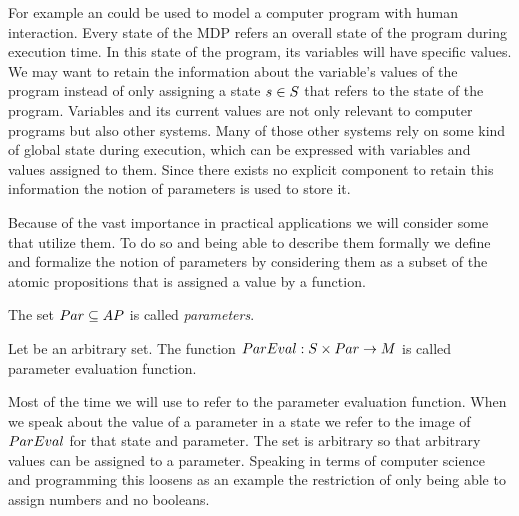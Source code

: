 \documentclass[preview]{standalone}
\begin{document}
For example an \mdpN could be used to model a computer program with human interaction. Every state of the MDP refers an overall state of the program during execution time. In this state of the program, its variables will have specific values. We may want to retain the information about the variable's values of the program instead of only assigning a state ${s} \in {S}$ that refers to the state of the program. Variables and its current values are not only relevant to computer programs but also other systems. Many of those other systems rely on some kind of global state during execution, which can be expressed with variables and values assigned to them. Since there exists no explicit component to retain this information the notion of parameters is used to store it.


Because of the vast importance in practical applications we will consider some \viewsN that utilize them. To do so and being able to describe them formally we define and formalize the notion of parameters by considering them as a subset of the atomic propositions \atomicprops that is assigned a value by a function.

\begin{definition}
	The set ${Par} \subseteq {AP}$ is called \emph{parameters}.
\end{definition}

\begin{definition}
	Let \paramevalimg be an arbitrary set. The function ${ParEval} : {S} \times {Par} \to {\ensuremath{{M}}}$ is called parameter evaluation function.
\end{definition} 

Most of the time we will use \parameval to refer to the parameter evaluation function. When we speak about the value of a parameter in a state we refer to the image of ${ParEval}$ for that state and parameter. The set \paramevalimg is arbitrary so that arbitrary values can be assigned to a parameter. Speaking in terms of computer science and programming this loosens as an example the restriction of only being able to assign numbers and no booleans.
\end{document}
